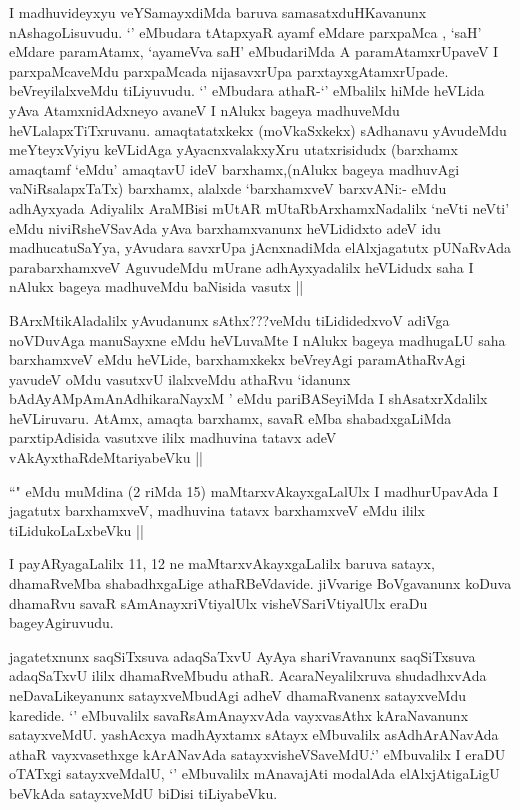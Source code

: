 \begin{artha}
 I madhuvideyxyu veYSamayxdiMda baruva samasatxduHKavanunx nAshagoLisuvudu. `\stext' eMbudara tAtapxyaR ayamf eMdare parxpaMca , `saH' eMdare paramAtamx, `ayameVva saH' eMbudariMda A paramAtamxrUpaveV I parxpaMcaveMdu parxpaMcada nijasavxrUpa parxtayxgAtamxrUpade. beVreyilalxveMdu tiLiyuvudu. `\stext' eMbudara athaR-`\stext' eMbalilx hiMde heVLida yAva AtamxnidAdxneyo avaneV I nAlukx bageya madhuveMdu heVLalapxTiTxruvanu. amaqtatatxkekx (moVkaSxkekx) sAdhanavu yAvudeMdu meYteyxVyiyu keVLidAga yAyacnxvalakxyXru utatxrisidudx (barxhamx amaqtamf `eMdu' amaqtavU ideV barxhamx,(nAlukx bageya madhuvAgi vaNiRsalapxTaTx) barxhamx, alalxde `barxhamxveV barxvANi:- eMdu adhAyxyada Adiyalilx AraMBisi mUtAR mUtaRbArxhamxNadalilx `neVti neVti' eMdu niviRsheVSavAda yAva barxhamxvanunx heVLididxto adeV idu madhucatuSaYya, yAvudara savxrUpa jAcnxnadiMda elAlxjagatutx pUNaRvAda parabarxhamxveV AguvudeMdu mUrane adhAyxyadalilx heVLidudx saha I nAlukx bageya madhuveMdu baNisida vasutx ||
\end{artha}

\begin{artha}
BArxMtikAladalilx yAvudanunx sAthx???veMdu tiLididedxvoV adiVga noVDuvAga manuSayxne eMdu 
heVLuvaMte I nAlukx bageya madhugaLU saha barxhamxveV eMdu heVLide, barxhamxkekx 
beVreyAgi paramAthaRvAgi yavudeV oMdu vasutxvU ilalxveMdu athaRvu `idanunx 
bAdAyAMpAmAnAdhikaraNayxM ' eMdu pariBASeyiMda I shAsatxrXdalilx heVLiruvaru. AtAmx, 
amaqta barxhamx, savaR eMba shabadxgaLiMda parxtipAdisida vasutxve ililx madhuvina 
tatavx adeV vAkAyxthaRdeMtariyabeVku ||

``\stext" eMdu muMdina (2 riMda 15) maMtarxvAkayxgaLalUlx I madhurUpavAda I jagatutx barxhamxveV, madhuvina tatavx barxhamxveV eMdu ililx tiLidukoLaLxbeVku ||
\end{artha}

\begin{artha}
I payARyagaLalilx 11, 12 ne maMtarxvAkayxgaLalilx baruva satayx, dhamaRveMba shabadhxgaLige athaRBeVdavide. jiVvarige BoVgavanunx koDuva dhamaRvu savaR sAmAnayxriVtiyalUlx visheVSariVtiyalUlx eraDu bageyAgiruvudu.

jagatetxnunx saqSiTxsuva adaqSaTxvU AyAya shariVravanunx saqSiTxsuva adaqSaTxvU ililx dhamaRveMbudu  athaR. AcaraNeyalilxruva shudadhxvAda neDavaLikeyanunx satayxveMbudAgi adheV dhamaRvanenx satayxveMdu karedide. `\stext' eMbuvalilx savaRsAmAnayxvAda vayxvasAthx kAraNavanunx satayxveMdU. yashAcxya madhAyxtamx sAtayx eMbuvalilx asAdhArANavAda athaR vayxvasethxge kArANavAda satayxvisheVSaveMdU.`\stext' eMbuvalilx I eraDU oTATxgi satayxveMdalU, `\stext' eMbuvalilx mAnavajAti modalAda elAlxjAtigaLigU beVkAda satayxveMdU biDisi tiLiyabeVku.
\end{artha}


